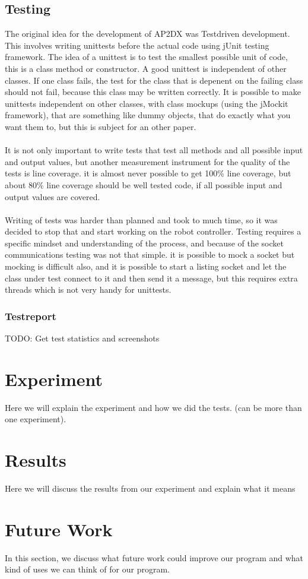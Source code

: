 \documentclass[titlepage, a4paper,10pt]{article}
\begin{document}
\subsection{Testing}
The original idea for the development of AP2DX was Testdriven development. This involves writing unittests before the actual code using jUnit testing framework. The idea of a unittest is to test the smallest possible unit of code, this is a class method or constructor. A good unittest is independent of other classes. If one class fails, the test for the class that is depenent on the failing class should not fail, because this class may be written correctly. It is possible to make unittests independent on other classes, with class mockups (using the jMockit framework), that are something like dummy objects, that do exactly what you want them to, but this is subject for an other paper.
\\\\
It is not only important to write tests that test all methods and all possible input and output values, but another measurement instrument for the quality of the tests is line coverage. it is almost never possible to get 100\% line coverage, but about 80\% line coverage should be well tested code, if all possible input and output values are covered.
\\\\
Writing of tests was harder than planned and took to much time, so it was decided to stop that and start working on the robot controller. Testing requires a specific mindset and understanding of the process, and because of the socket communications testing was not that simple. it is possible to mock a socket but mocking is difficult also, and it is possible to start a listing socket and let the class under test connect to it and then send it a message, but this requires extra threads which is not very handy for unittests.

\subsubsection{Testreport}
TODO: Get test statistics and screenshots

\newpage

\section{Experiment}
Here we will explain the experiment and how we did the tests. (can be more than one experiment).

\newpage

\section{Results}
Here we will discuss the results from our experiment and explain what it means

\newpage

\section{Future Work}
In this section, we discuss what future work could improve our program and what kind of uses we can think of for our program.
\end{document}
